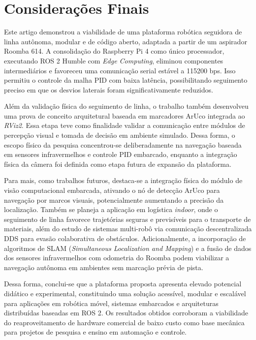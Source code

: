 \chapter{Considerações Finais}
\label{sec:conclusao}

Este artigo demonstrou a viabilidade de uma plataforma robótica seguidora de linha autônoma, modular e de código aberto, adaptada a partir de um aspirador Roomba 614. A consolidação do Raspberry Pi 4 como único processador, executando ROS 2 Humble com \textit{Edge Computing}, eliminou componentes intermediários e favoreceu uma comunicação serial estável a 115200 bps. Isso permitiu o controle da malha PID com baixa latência, possibilitando seguimento preciso em que os desvios laterais foram significativamente reduzidos.

Além da validação física do seguimento de linha, o trabalho também desenvolveu uma prova de conceito arquitetural baseada em marcadores ArUco integrada ao \textit{RViz2}. Essa etapa teve como finalidade validar a comunicação entre módulos de percepção visual e tomada de decisão em ambiente simulado. Dessa forma, o escopo físico da pesquisa concentrou-se deliberadamente na navegação baseada em sensores infravermelhos e controle PID embarcado, enquanto a integração física da câmera foi definida como etapa futura de expansão da plataforma.


Para mais, como trabalhos futuros, destaca-se a integração física do módulo de visão computacional embarcada, ativando o nó de detecção ArUco para navegação por marcos visuais, potencialmente aumentando a precisão da localização. Também se planeja a aplicação em logística \textit{indoor}, onde o seguimento de linha favorece trajetórias seguras e previsíveis para o transporte de materiais, além do estudo de sistemas multi-robô via comunicação descentralizada DDS para evasão colaborativa de obstáculos. Adicionalmente, a incorporação de algoritmos de SLAM (\textit{Simultaneous Localization and Mapping}) e a fusão de dados dos sensores infravermelhos com odometria do Roomba podem viabilizar a navegação autônoma em ambientes sem marcação prévia de pista.

Dessa forma, conclui-se que a plataforma proposta apresenta elevado potencial didático e experimental, constituindo uma solução acessível, modular e escalável para aplicações em robótica móvel, sistemas embarcados e arquiteturas distribuídas baseadas em ROS 2. Os resultados obtidos corroboram a viabilidade do reaproveitamento de hardware comercial de baixo custo como base mecânica para projetos de pesquisa e ensino em automação e controle.